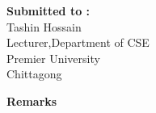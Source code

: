 \begin{titlepage}
\begin{minipage}[t]{0.5\textwidth}
        \textbf{Submitted to :}
        \\Tashin Hossain
        \\Lecturer,Department of CSE
        \\ Premier University
        \\ Chittagong
    \end{minipage}%
    \begin{minipage}[t]{0.6\textwidth}
        \raggedleft
        \textbf{Remarks}\\
        \vspace{0.5cm} %
    \end{minipage}

    \date{\today}
    \vfill
\end{titlepage}


\newpage
